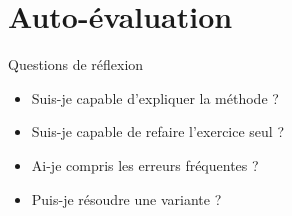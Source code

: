 \documentclass[11pt,a4paper]{article}
\begin{document}
\section{Auto-évaluation}

\begin{cadregris}{Questions de réflexion}
\begin{itemize}
    \item Suis-je capable d’expliquer la méthode ?
    \item Suis-je capable de refaire l’exercice seul ?
    \item Ai-je compris les erreurs fréquentes ?
    \item Puis-je résoudre une variante ?
\end{itemize}
\end{cadregris}
\end{document}
